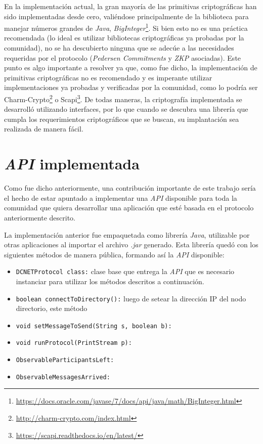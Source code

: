 En la implementación actual, la gran mayoría de las primitivas criptográficas han sido implementadas desde cero, valiéndose principalmente de la biblioteca para manejar números grandes de \emph{Java}, \emph{BigInteger}\footnote{\url{https://docs.oracle.com/javase/7/docs/api/java/math/BigInteger.html}}. Si bien esto no es una práctica recomendada (lo ideal es utilizar bibliotecas criptográficas ya probadas por la comunidad), no se ha descubierto ninguna que se adecúe a las necesidades requeridas por el protocolo (\emph{Pedersen Commitments} y \emph{ZKP} asociadas). Este punto es algo importante a resolver ya que, como fue dicho, la implementación de primitivas criptográficas no es recomendado y es imperante utilizar implementaciones ya probadas y verificadas por la comunidad, como lo podría ser Charm-Crypto\footnote{\url{http://charm-crypto.com/index.html}} o Scapi\footnote{\url{https://scapi.readthedocs.io/en/latest/}}. De todas maneras, la criptografía implementada se desarrolló utilizando interfaces, por lo que cuando se descubra una librería que cumpla los requerimientos criptográficos que se buscan, su implantación sea realizada de manera fácil.

\section{\emph{API} implementada}

Como fue dicho anteriormente, una contribución importante de este trabajo sería el hecho de estar apuntado a implementar una \emph{API} disponible para toda la comunidad que quiera desarrollar una aplicación que esté basada en el protocolo anteriormente descrito. 

La implementación anterior fue empaquetada como librería \emph{Java}, utilizable por otras aplicaciones al importar el archivo \emph{.jar} generado. Esta librería quedó con los siguientes métodos de manera pública, formando así la \emph{API} disponible:

\begin{itemize}
    \item \texttt{DCNETProtocol class:} clase base que entrega la \emph{API} que es necesario instanciar para utilizar los métodos descritos a continuación. 
    \item \texttt{boolean connectToDirectory():} luego de setear la dirección IP del nodo directorio, este método
    \item \texttt{void setMessageToSend(String s, boolean b):}
    \item \texttt{void runProtocol(PrintStream p):}
    \item \texttt{ObservableParticipantsLeft:}
    \item \texttt{ObservableMessagesArrived:}
\end{itemize}

